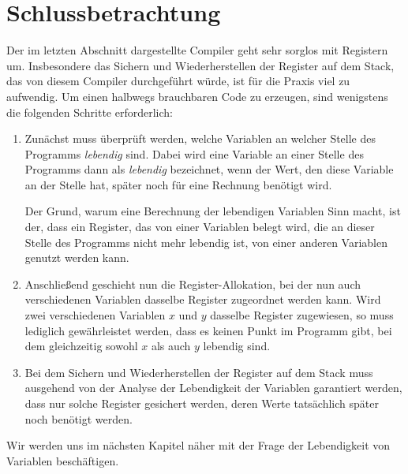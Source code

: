 \section{Schlussbetrachtung}
Der im letzten Abschnitt dargestellte Compiler geht sehr sorglos mit Registern um.
Insbesondere das Sichern und Wiederherstellen der Register auf dem Stack, das von diesem
Compiler durchgef\"uhrt w\"urde, ist f\"ur die Praxis viel zu aufwendig.  Um einen
halbwegs brauchbaren Code zu erzeugen, sind wenigstens die folgenden Schritte
erforderlich:
\begin{enumerate}
\item Zun\"achst muss \"uberpr\"uft werden, welche Variablen an welcher Stelle des Programms
      \emph{lebendig} sind.  Dabei wird eine Variable an einer Stelle des Programms 
      dann als \emph{lebendig} bezeichnet, wenn der Wert, den diese Variable an der Stelle
      hat, sp\"ater noch f\"ur eine Rechnung ben\"otigt wird.

      Der Grund, warum eine Berechnung der lebendigen Variablen Sinn macht, ist der, dass
      ein Register, das von einer Variablen belegt wird, die an dieser Stelle des
      Programms nicht mehr lebendig ist, von einer anderen Variablen genutzt werden kann.
\item Anschlie{\ss}end geschieht nun die Register-Allokation, bei der nun auch verschiedenen
      Variablen dasselbe Register zugeordnet werden kann.   Wird zwei verschiedenen
      Variablen $x$ und $y$ dasselbe Register zugewiesen, so muss lediglich gew\"ahrleistet 
      werden, dass es keinen Punkt im Programm gibt, bei dem gleichzeitig sowohl $x$ als
      auch $y$ lebendig sind.
\item Bei dem Sichern und Wiederherstellen der Register auf dem Stack muss ausgehend von der Analyse
      der Lebendigkeit der Variablen garantiert werden, dass nur solche Register gesichert
      werden, deren Werte tats\"achlich sp\"ater noch ben\"otigt werden. 
\end{enumerate}
Wir werden uns im n\"achsten Kapitel n\"aher mit der Frage der Lebendigkeit von Variablen besch\"aftigen.


